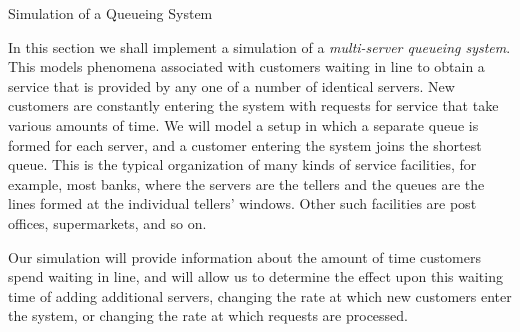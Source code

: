 % 
% 
% 
% 
% 
% 

 {Simulation of a Queueing System}

\noindent
In this section we shall implement a simulation of a {\it multi-server
queueing system}.  This models phenomena associated with customers
waiting in line to obtain a service that is provided by any
one of a number of identical servers.  New customers are constantly
entering the system with requests for service that take various
amounts of time.  We will model a setup in which a separate queue is
formed for each server, and a customer entering the system joins the
shortest queue.  This is the typical organization of many kinds of
service facilities, for example, most banks, where the servers are the
tellers and the queues are the lines formed at the individual tellers'
windows.  Other such facilities are post offices, supermarkets, and so on.

\parindent10pt
Our simulation will provide information about the amount of time
customers spend waiting in line, and will allow us to determine the
effect upon this waiting time of adding additional servers, changing
the rate at which new customers enter the system, or changing the rate
at which requests are processed.

